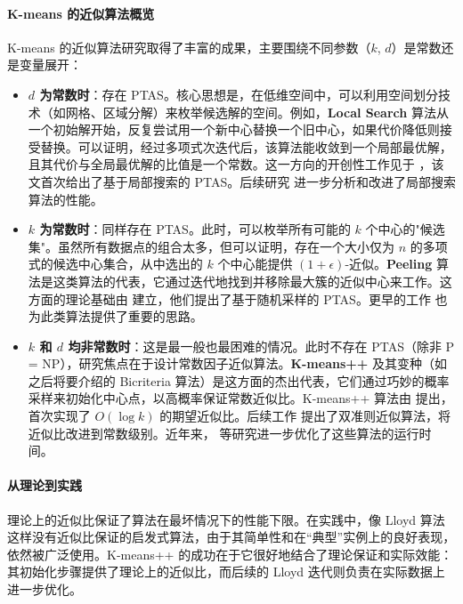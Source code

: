 \documentclass[lang=cn,newtx,10pt,scheme=chinese,chinesefont=nofont,citestyle=gb7714-2015, bibstyle=gb7714-2015]{elegantbook}
\begin{document}
\begin{refsection}
\paragraph*{K-means 的近似算法概览}K-means 的近似算法研究取得了丰富的成果，主要围绕不同参数（$k$, $d$）是常数还是变量展开：
\begin{itemize}
\item \textbf{$d$ 为常数时}：存在 PTAS。核心思想是，在低维空间中，可以利用空间划分技术（如网格、区域分解）来枚举候选解的空间。例如，\textbf{Local Search} 算法从一个初始解开始，反复尝试用一个新中心替换一个旧中心，如果代价降低则接受替换。可以证明，经过多项式次迭代后，该算法能收敛到一个局部最优解，且其代价与全局最优解的比值是一个常数。这一方向的开创性工作见于 \cite{matousek2000approximate}，该文首次给出了基于局部搜索的 PTAS。后续研究 \cite{kanungo2002local} 进一步分析和改进了局部搜索算法的性能。

\item \textbf{$k$ 为常数时}：同样存在 PTAS。此时，可以枚举所有可能的 $k$ 个中心的"候选集"。虽然所有数据点的组合太多，但可以证明，存在一个大小仅为 $n$ 的多项式的候选中心集合，从中选出的 $k$ 个中心能提供 $(1+\epsilon)$-近似。\textbf{Peeling} 算法是这类算法的代表，它通过迭代地找到并移除最大簇的近似中心来工作。这方面的理论基础由 \cite{jaiswal2012k} 建立，他们提出了基于随机采样的 PTAS。更早的工作 \cite{kumar2010linear} 也为此类算法提供了重要的思路。

\item \textbf{$k$ 和 $d$ 均非常数时}：这是最一般也最困难的情况。此时不存在 PTAS（除非 P = NP），研究焦点在于设计常数因子近似算法。\textbf{K-means++} 及其变种（如之后将要介绍的 Bicriteria 算法）是这方面的杰出代表，它们通过巧妙的概率采样来初始化中心点，以高概率保证常数近似比。K-means++ 算法由 \cite{arthur2006k} 提出，首次实现了 $O(\log k)$ 的期望近似比。后续工作 \cite{aggarwal2009analysis} 提出了双准则近似算法，将近似比改进到常数级别。近年来，\cite{aghazadeh2020fast} 等研究进一步优化了这些算法的运行时间。
\end{itemize}
\paragraph*{从理论到实践}

理论上的近似比保证了算法在最坏情况下的性能下限。在实践中，像 Lloyd 算法这样没有近似比保证的启发式算法，由于其简单性和在“典型”实例上的良好表现，依然被广泛使用。K-means++ 的成功在于它很好地结合了理论保证和实际效能：其初始化步骤提供了理论上的近似比，而后续的 Lloyd 迭代则负责在实际数据上进一步优化。


\end{refsection}
\end{document}
